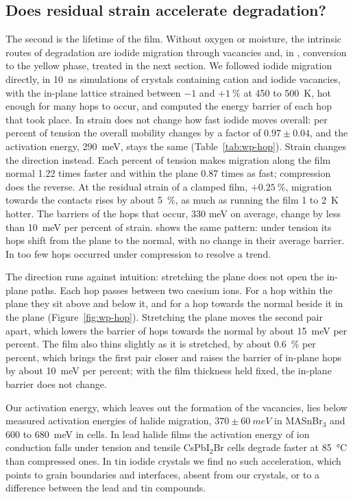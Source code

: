 \subsection{Does residual strain accelerate degradation?}
\label{sec:wp-hop}
The second is the lifetime of the film. Without oxygen or moisture, the intrinsic routes of degradation are iodide migration through vacancies and, in
\CsSnI{}, conversion to the yellow phase, treated in the next section. We followed iodide migration directly, in
\SI{10}{ns} simulations of crystals containing cation and iodide vacancies, with the in-plane lattice strained between
$-1$ and $+\SI{1}{\percent}$ at 450 to \SI{500}{K}, hot enough for many hops to occur, and computed the energy barrier
of each hop that took place. In \CsSnI{} strain does not change how fast iodide moves overall: per percent of tension the
overall mobility changes by a factor of $0.97 \pm 0.04$, and the activation energy, \SI{290}{meV}, stays the same
(Table~\ref{tab:wp-hop}). Strain changes the direction instead. Each percent of tension makes migration along the film
normal 1.22 times faster and within the plane 0.87 times as fast; compression does the reverse. At the residual strain
of a clamped film, $+\SI{0.25}{\percent}$, migration towards the contacts rises by about \SI{5}{\percent}, as much as
running the film 1 to \SI{2}{K} hotter. The barriers of the hops that occur, 330 meV on average, change by less than
\SI{10}{meV} per percent of strain. \MASnI{} shows the same pattern: under tension its hops shift from the plane to the
normal, with no change in their average barrier. In \FASnI{} too few hops occurred under compression to resolve a trend.

The direction runs against intuition: stretching the plane does not open the in-plane paths. Each hop passes between two
caesium ions. For a hop within the plane they sit above and below it, and for a hop towards the normal beside it in the
plane (Figure~\ref{fig:wp-hop}). Stretching the plane moves the second pair apart, which lowers the barrier of hops
towards the normal by about \SI{15}{meV} per percent. The film also thins slightly as it is stretched, by about
\SI{0.6}{\percent} per percent, which brings the first pair closer and raises the barrier of in-plane hops by about
\SI{10}{meV} per percent; with the film thickness held fixed, the in-plane barrier does not change.

Our activation energy, which leaves out the formation of the vacancies, lies below measured activation energies of halide
migration, $370 \pm \SI{60}{meV}$ in MASnBr$_3$\cite{Kubicki2020JACS} and 600 to \SI{680}{meV} in 
cells.\cite{Eames2015NatCommun} In lead halide films the activation
energy of ion conduction falls under tension\cite{Zhao2017SciAdv} and tensile CsPbI$_2$Br cells degrade faster at
\SI{85}{\celsius} than compressed ones.\cite{ref_processing_temp} In tin iodide crystals we find no such acceleration,
which points to grain boundaries and interfaces, absent from our crystals, or to a difference between the lead and tin
compounds.

